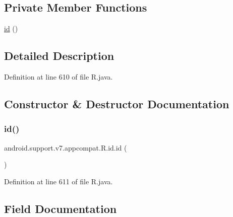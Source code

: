 \subsection*{Private Member Functions}
\begin{DoxyCompactItemize}
\item 
\mbox{\hyperlink{classandroid_1_1support_1_1v7_1_1appcompat_1_1_r_1_1id_ac0a4ca60056aa9bf7c58208668315173}{id}} ()
\end{DoxyCompactItemize}


\subsection{Detailed Description}


Definition at line 610 of file R.\+java.



\subsection{Constructor \& Destructor Documentation}
\mbox{\label{classandroid_1_1support_1_1v7_1_1appcompat_1_1_r_1_1id_ac0a4ca60056aa9bf7c58208668315173}} 
\subsubsection{\texorpdfstring{id()}{id()}}
{\footnotesize\ttfamily android.\+support.\+v7.\+appcompat.\+R.\+id.\+id (\begin{DoxyParamCaption}{ }\end{DoxyParamCaption})\hspace{0.3cm}{\ttfamily [private]}}



Definition at line 611 of file R.\+java.


\begin{DoxyCode}{0}

\end{DoxyCode}


\subsection{Field Documentation}
\mbox{\label{classandroid_1_1support_1_1v7_1_1appcompat_1_1_r_1_1id_a6c9c8b18c3b57617cf60a9b1ad51f2f1}} 
